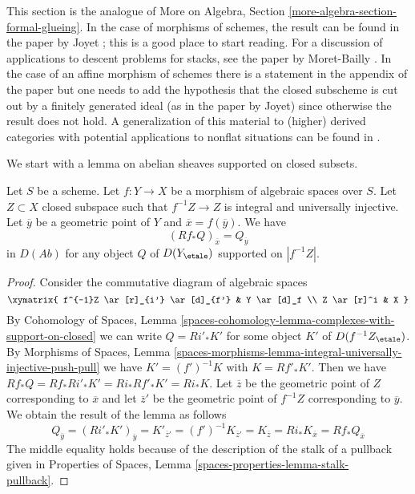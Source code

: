 \noindent
This section is the analogue of
More on Algebra, Section \ref{more-algebra-section-formal-glueing}.
In the case of morphisms of schemes, the result can be found in
the paper by Joyet \cite{Joyet}; this is a good place to start reading.
For a discussion of applications to descent problems for stacks, see the
paper by Moret-Bailly \cite{MB}. In the case of an affine
morphism of schemes there is a statement in the appendix of the paper
\cite{Ferrand-Raynaud} but one needs to add the hypothesis
that the closed subscheme is cut out by a finitely generated
ideal (as in the paper by Joyet) since otherwise the result does not hold.
A generalization of this material to (higher) derived categories
with potential applications to nonflat situations
can be found in \cite[Section 5]{Bhatt-Algebraize}.

\medskip\noindent
We start with a lemma on abelian sheaves supported on closed subsets.

\begin{lemma}
\label{lemma-stalk-pushforward-with-support}
Let $S$ be a scheme. Let $f : Y \to X$ be a morphism of algebraic spaces
over $S$. Let $Z \subset X$ closed subspace such that $f^{-1}Z \to Z$ is
integral and universally injective. Let $\overline{y}$ be a geometric point
of $Y$ and $\overline{x} = f(\overline{y})$. We have
$$
(Rf_*Q)_{\overline{x}} = Q_{\overline{y}}
$$
in $D(\textit{Ab})$ for any object $Q$ of $D(Y_\etale)$ supported
on $|f^{-1}Z|$.
\end{lemma}

\begin{proof}
Consider the commutative diagram of algebraic spaces
$$
\xymatrix{
f^{-1}Z \ar[r]_{i'} \ar[d]_{f'} & Y \ar[d]_f \\
Z \ar[r]^i & X
}
$$
By Cohomology of Spaces, Lemma
\ref{spaces-cohomology-lemma-complexes-with-support-on-closed} we can write
$Q = Ri'_*K'$ for some object $K'$ of $D(f^{-1}Z_\etale)$.
By Morphisms of Spaces, Lemma
\ref{spaces-morphisms-lemma-integral-universally-injective-push-pull}
we have $K' = (f')^{-1}K$ with $K = Rf'_*K'$.
Then we have $Rf_*Q = Rf_*Ri'_*K' = Ri_*Rf'_*K' = Ri_*K$.
Let $\overline{z}$ be the geometric point of $Z$ corresponding
to $\overline{x}$ and let $\overline{z}'$ be the geometric point
of $f^{-1}Z$ corresponding to $\overline{y}$. We obtain
the result of the lemma as follows
$$
Q_{\overline{y}} = (Ri'_*K')_{\overline{y}} = K'_{\overline{z}'} =
(f')^{-1}K_{\overline{z}'} = K_{\overline{z}} = Ri_*K_{\overline{x}} =
Rf_*Q_{\overline{x}}
$$
The middle equality holds because of the description of the stalk
of a pullback given in
Properties of Spaces, Lemma \ref{spaces-properties-lemma-stalk-pullback}.
\end{proof}

